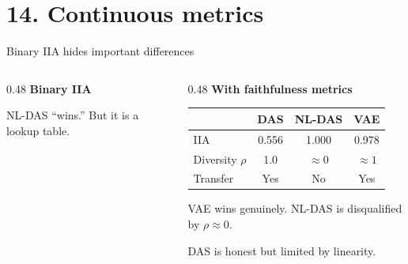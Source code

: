 \documentclass[aspectratio=169,11pt]{beamer}
\begin{document}
\section{14. Continuous metrics}

\begin{frame}{Binary IIA hides important differences}

\begin{columns}[T]
\begin{column}{0.48\textwidth}
\centering
\textbf{Binary IIA}

\vspace{0.3em}

{\small NL-DAS ``wins.'' But it is a lookup table.}
\end{column}
\begin{column}{0.48\textwidth}
\centering
\textbf{With faithfulness metrics}

\vspace{0.3em}
{\small\setlength{\tabcolsep}{2pt}
\begin{tabular}{lccc}
\toprule
& \textbf{DAS} & \textbf{NL-DAS} & \textbf{VAE} \\
\midrule
IIA & 0.556 & \textcolor{fail}{1.000} & \textcolor{pass}{0.978} \\
Diversity $\rho$ & 1.0 & \textcolor{fail}{$\approx 0$} & \textcolor{pass}{$\approx 1$} \\
Transfer & Yes & \textcolor{fail}{No} & \textcolor{pass}{Yes} \\
\bottomrule
\end{tabular}}

\vspace{0.5em}
{\small VAE wins genuinely. NL-DAS is disqualified by $\rho \approx 0$.}

\vspace{0.3em}
{\small DAS is honest but limited by linearity.}
\end{column}
\end{columns}
\end{frame}
\end{document}

